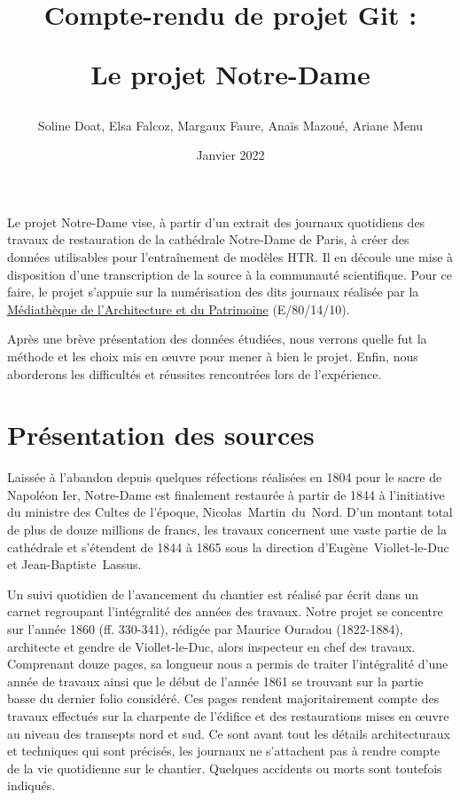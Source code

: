 \documentclass{article}
\title{Compte-rendu de projet Git : 

Le projet Notre-Dame
}
\author{Soline Doat, Elsa Falcoz, Margaux Faure, Anaïs Mazoué, Ariane Menu}
\date{Janvier 2022}
\begin{document}
\maketitle

Le projet Notre-Dame vise, à partir d’un extrait des journaux quotidiens des travaux de restauration de la cathédrale Notre-Dame de Paris, à créer des données utilisables pour l'entraînement de modèles HTR. Il en découle une mise à disposition d’une transcription de la source à la communauté scientifique. Pour ce faire, le projet s’appuie sur la numérisation des dits journaux réalisée par la  \href{https://mediatheque-patrimoine.culture.gouv.fr/travaux-de-notre-dame-de-paris-1844-1865}{Médiathèque de l’Architecture et du Patrimoine} (E/80/14/10). 

Après une brève présentation des données étudiées, nous verrons quelle fut la méthode et les choix mis en œuvre pour mener à bien le projet. Enfin, nous aborderons les difficultés et réussites rencontrées lors de l’expérience.


\section{Présentation des sources}

Laissée à l’abandon depuis quelques réfections réalisées en 1804 pour le sacre de Napoléon Ier, Notre-Dame est finalement restaurée à partir de 1844 à l’initiative du ministre des Cultes de l’époque, Nicolas~Martin~du~Nord. D’un montant total de plus de douze millions de francs, les travaux concernent une vaste partie de la cathédrale et s’étendent de 1844 à 1865 sous la direction d’Eugène~Viollet-le-Duc et Jean-Baptiste~Lassus.


Un suivi quotidien de l’avancement du chantier est réalisé par écrit dans un carnet regroupant l’intégralité des années des travaux. Notre projet se concentre sur l’année 1860 (ff. 330-341), rédigée par Maurice Ouradou (1822-1884), architecte et gendre de Viollet-le-Duc, alors inspecteur en chef des travaux. Comprenant douze pages, sa longueur nous a permis de traiter l’intégralité d’une année de travaux ainsi que le début de l’année 1861 se trouvant sur la partie basse du dernier folio considéré. Ces pages rendent majoritairement compte des travaux effectués sur la charpente de l’édifice et des restaurations mises en œuvre au niveau des transepts nord et sud. Ce sont avant tout les détails architecturaux et techniques qui sont précisés, les journaux ne s’attachent pas à rendre compte de la vie quotidienne sur le chantier. Quelques accidents ou morts sont toutefois indiqués.
\end{document}
